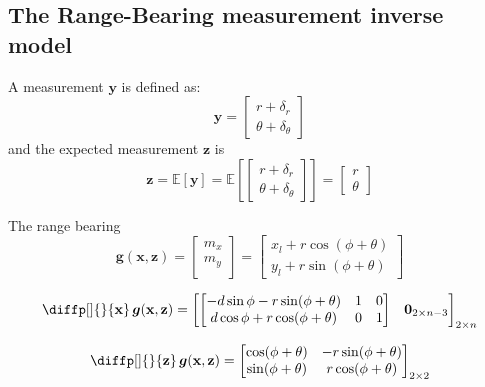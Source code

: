 \documentclass[12pt]{article}
\newcommand{\bvec}[1]{\boldsymbol{\mathbf{#1}}} %
\newcommand{\mat}[1]{\boldsymbol{\mathbf{#1}}}
\newcommand{\brac}[1]{\left[#1\right]} %
\newcommand{\mb}[1]{{\boldsymbol{#1}}} %
\newcommand{\expv}[1]{\mathbb{E}\brac{#1}} %
\newcommand{\matnull}[2]{\mat{0}_{#1\times#2}} %
\begin{document}
\subsection{The Range-Bearing measurement inverse model}
\label{sec:inv-measurement-model}
A measurement $\bvec{y}$ is defined as:
\begin{equation}
    \bvec{y} = \begin{bmatrix}
        r + \delta_r\\ 
        \theta + \delta_\theta \end{bmatrix}
\end{equation}
and the expected measurement $\bvec{z}$ is
\begin{equation}
    \bvec{z} = \expv{\bvec{y}} = \expv{
        \begin{bmatrix}
        r + \delta_r\\ 
        \theta + \delta_\theta \end{bmatrix}} = \begin{bmatrix}
            r \\ \theta
        \end{bmatrix}
\end{equation}

The range bearing 
\begin{equation}
    \mb{g}(\bvec{x}, \bvec{z}) = 
    \begin{bmatrix}
        m_x \\
        m_y \\
    \end{bmatrix} =
    \begin{bmatrix}
        x_l + r \cos(\phi + \theta)\\
        y_l + r \sin(\phi + \theta) 
    \end{bmatrix}
    \label{eq:measurement-inverse-model}
\end{equation}

\begin{equation}
    \diffp[]{}{\bvec{x}} \, \mb{g}(\bvec{x}, \bvec{z}) = 
    \begin{bmatrix}\begin{bmatrix}
        -d \sin{\phi} - r \sin(\phi + \theta)  & 1 & 0\\
        d\cos{\phi} + r\cos(\phi + \theta) & 0 & 1
    \end{bmatrix} & \matnull{2}{n-3} \end{bmatrix}_{2 \times n}
\end{equation}

\begin{equation}
    \diffp[]{}{\bvec{z}} \, \mb{g}(\bvec{x}, \bvec{z}) = \begin{bmatrix}
       \cos(\phi + \theta) & -r\sin(\phi + \theta)\\
       \sin(\phi + \theta) & r\cos(\phi + \theta)
    \end{bmatrix}_{2 \times 2}
\end{equation}
\end{document}

